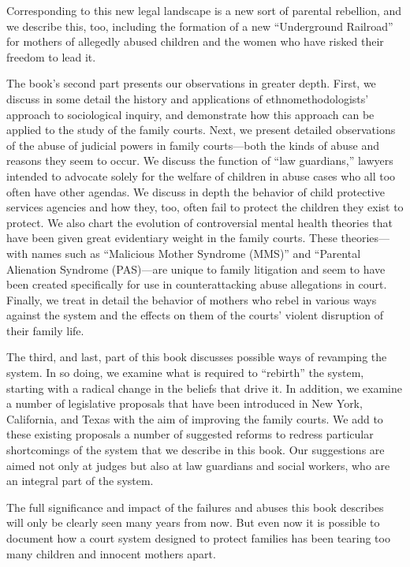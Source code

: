 Corresponding to this new legal landscape is a new sort of parental rebellion, and we describe this, too, including the formation of a new “Underground Railroad” for mothers of allegedly abused children and the women who have risked their freedom to lead it. \pfl{}


The book’s second part presents our observations in greater depth. First, we discuss in some detail the history and applications of ethnomethodologists’ approach to sociological inquiry, and demonstrate how this approach can be applied to the study of the family courts. Next, we present detailed observations of the abuse of judicial powers in family courts—both the kinds of abuse and reasons they seem to occur. We discuss the function of “law guardians,” lawyers intended to advocate solely for the welfare of children in abuse cases who all too often have other agendas. We discuss in depth the behavior of child protective services agencies and how they, too, often fail to protect the children they exist to protect. We also chart the evolution of controversial mental health theories that have been given great evidentiary weight in the family courts. These theories—with names such as “Malicious Mother Syndrome (MMS)” and “Parental Alienation Syndrome (PAS)—are unique to family litigation and seem to have been created specifically for use in counterattacking abuse allegations in court. Finally, we treat in detail the behavior of mothers who rebel in various ways against the system and the effects on them of the courts’ violent disruption of their family life. \pfl{}


The third, and last, part of this book discusses possible ways of revamping the system. In so doing, we examine what is required to “rebirth” the system, starting with a radical change in the beliefs that drive it. In addition, we examine a number of legislative proposals that have been introduced in New York, California, and Texas with the aim of improving the family courts. We add to these existing proposals a number of suggested reforms to redress particular shortcomings of the system that we describe in this book. Our suggestions are aimed not only at judges but also at law guardians and social workers, who are an integral part of the system. \pfl{}


The full significance and impact of the failures and abuses this book describes will only be clearly seen many years from now. But even now it is possible to document how a court system designed to protect families has been tearing too many children and innocent mothers apart.

